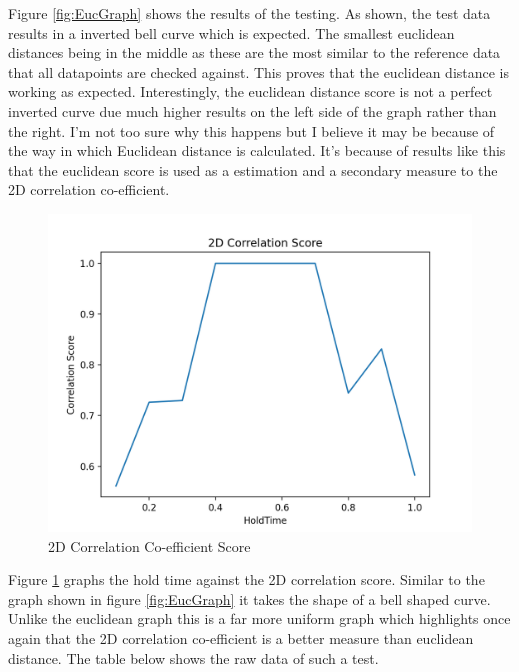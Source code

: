 \documentclass[10pt,a4paper]{report}
\begin{document}
Figure \ref{fig:EucGraph} shows the results of the testing. As shown, the test data results in a inverted bell curve which is expected. The smallest euclidean distances being in the middle as these are the most similar to the reference data that all datapoints are checked against. This proves that the euclidean distance is working as expected. Interestingly, the euclidean distance score is not a perfect inverted curve due much higher results on the left side of the graph rather than the right. I'm not too sure why this happens but I believe it may be because of the way in which Euclidean distance is calculated. It's because of results like this that the euclidean score is used as a estimation and a secondary measure to the 2D correlation co-efficient.

\begin{figure}
	\centering
	\includegraphics[scale=0.6]{CorrGraph}
	\caption{2D Correlation Co-efficient Score}
	\label{fig:2DGraph}
\end{figure}

Figure \ref{fig:2DGraph} graphs the hold time against the 2D correlation score. Similar to the graph shown in figure \ref{fig:EucGraph} it takes the shape of a bell shaped curve. Unlike the euclidean graph this is a far more uniform graph which highlights once again that the 2D correlation co-efficient is a better measure than euclidean distance. The table below shows the raw data of such a test.
\end{document}
